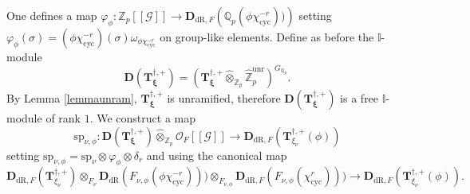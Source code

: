 \documentclass[a4paper,11pt]{amsart}
\numberwithin{equation}{section}
\theoremstyle{plain}
\theoremstyle{definition}
\theoremstyle{remark}
\newcommand{\Q}{\mathbb Q}
\newcommand{\Z}{\mathbb Z}
\newcommand{\I}{\mathbb{I}}
\newcommand{\J}{\mathbb{J}}
\newcommand{\cyc}{{\mathrm{cyc}}}
\newcommand{\dR}{\mathrm{dR}}
\newcommand{\unr}{\mathrm{unr}}
\begin{document}
{One defines a map 
$\varphi_\phi\colon \Z_p[[\mathcal{G}]]\rightarrow  \mathbf{D}_{\dR,F}\left(\Q_p(\phi\chi_\cyc^{-r}))\right)$  
setting $\varphi_\phi(\sigma)=(\phi\chi_\cyc^{-r})(\sigma)\omega_{\phi\chi_\cyc^{-r}}$ on group-like elements.
Define as before the $\I$-module 
\[\mathbf{D}(\mathbf{T}_{\boldsymbol{\xi}}^{\dagger,+})=(\mathbf{T}_{\boldsymbol{\xi}}^{\dagger,+}\widehat\otimes_{\Z_p}\widehat{\Z}_p^\unr)^{G_{\Q_p}}.\] 
By Lemma \ref{lemmaunram}, $\mathbf{T}_{\boldsymbol{\xi}}^{\dagger,+}$ is unramified, 
therefore $\mathbf{D}(\mathbf{T}_{\boldsymbol{\xi}}^{\dagger,+})$ is a free $\I$-module of rank $1$.  
We construct a map 
\begin{equation}\label{spec}
\mathrm{sp}_{\nu,\phi}\colon \mathbf{D} (\mathbf{T}^{\dagger,+}_{\boldsymbol{\xi}} )\widehat\otimes_{\Z_p}\mathcal{O}_F[[{\mathcal{G}}]]\longrightarrow\mathbf{D}_{\dR,F} ( \mathbf{T}^{\dagger,+}_{\xi_\nu}(\phi) )\end{equation}
setting $\mathrm{sp}_{\nu,\phi}=\mathrm{sp}_{\nu}\otimes \varphi_\phi\otimes \delta_r$ and using the canonical map 
\[  
\mathbf{D}_{\dR,F}(\mathbf{T}^{\dagger,+}_{\xi_\nu})\otimes_{F_\nu}\mathbf{D}_{\dR}(F_{\nu,\phi}(\phi\chi_\cyc^{-r})))\otimes_{F_{\nu,\phi}}\mathbf{D}_{\dR,F}(F_{\nu,\phi}(\chi_\cyc^{r})))
\longrightarrow \mathbf{D}_{\dR,F} ( \mathbf{T}^{\dagger,+}_{\xi_\nu}(\phi) ).
\]
}
\end{document}
